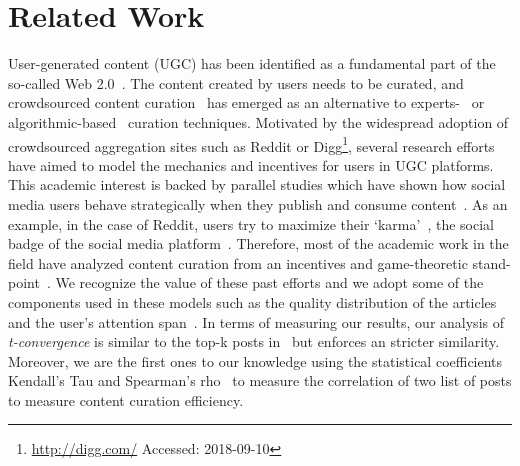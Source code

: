 \section{Related Work}
  User-generated content (UGC) has been identified as a fundamental part of the so-called Web 2.0~\cite{kaplan2010users}. The content created by users needs to be curated, and crowdsourced content curation~\cite{askalidis2013theoretical} has emerged as an alternative to experts-~\cite{stanoevska2012content} or algorithmic-based~\cite{rader2015understanding} curation techniques. Motivated by the widespread adoption of crowdsourced aggregation sites such as Reddit or Digg\footnote{\url{http://digg.com/} Accessed: 2018-09-10}, several research efforts~\cite{das2010ranking,ghosh2011incentivizing} have aimed to model the mechanics and incentives for users in UGC platforms. This academic interest is backed by parallel studies which have shown how
social media users behave strategically when they publish and consume content~\cite{may2014filter}. As an example, in the case of Reddit, users try to maximize their `karma'~\cite{bergstrom2011don}, the social badge of the social media platform~\cite{anderson2013steering}. 
   Therefore, most of the academic work in the field have analyzed content curation from an incentives and game-theoretic stand-point~\cite{ghosh2011incentivizing,das2010ranking,gupte2009news,may2014filter}. We recognize the value of these past efforts and we adopt some of the components used in these models such as the quality distribution of the articles and the user's attention span~\cite{askalidis2013theoretical,ghosh2011incentivizing}. In terms of measuring our results,  our analysis of \textit{t-convergence} is similar to the top-k posts in~\cite{askalidis2013theoretical} but enforces an stricter similarity. Moreover, we are the first ones to our knowledge using the statistical coefficients Kendall's Tau and Spearman's rho~\cite{xu2013comparative,yue2002power} to measure the correlation of two list of posts to measure content curation efficiency. \\
   
